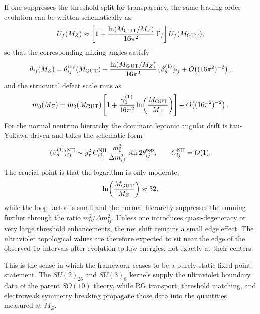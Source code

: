 \documentclass[11pt]{article}
\begin{document}
If one suppresses the threshold split for transparency, the same leading-order evolution can be written schematically as
\begin{equation}
 U_f(M_Z)
 \approx
 \left[\mathbf{1} + \frac{\ln(M_{\rm GUT}/M_Z)}{16\pi^2}\,\Gamma_f\right]U_f(M_{\rm GUT}),
\end{equation}
so that the corresponding mixing angles satisfy
\begin{equation}
 \theta_{ij}(M_Z)
 = \theta_{ij}^{\rm top}(M_{\rm GUT})
 + \frac{\ln(M_{\rm GUT}/M_Z)}{16\pi^2}\,(\beta_{\theta}^{(1)})_{ij}
 + O\!\left((16\pi^2)^{-2}\right),
\end{equation}
and the structural defect scale runs as
\begin{equation}
 m_0(M_Z)
 = m_0(M_{\rm GUT})
 \left[1 + \frac{\gamma_0^{(1)}}{16\pi^2}\ln\!\left(\frac{M_{\rm GUT}}{M_Z}\right)\right]
 + O\!\left((16\pi^2)^{-2}\right).
\end{equation}
For the normal neutrino hierarchy the dominant leptonic angular drift is tau-Yukawa driven and takes the schematic form
\begin{equation}
 (\beta_{\theta}^{(1)})_{ij}^{\rm NH}
 \sim
 y_{\tau}^2\,C_{ij}^{\rm NH}\,\frac{m_0^2}{\Delta m_{ij}^2}\,\sin2\theta_{ij}^{\rm top},
 \qquad
 C_{ij}^{\rm NH}=O(1).
\end{equation}
The crucial point is that the logarithm is only moderate,
\begin{equation}
 \ln\!\left(\frac{M_{\rm GUT}}{M_Z}\right)\approx 32,
\end{equation}
while the loop factor is small and the normal hierarchy suppresses the running further through the ratio $m_0^2/\Delta m_{ij}^2$. Unless one introduces quasi-degeneracy or very large threshold enhancements, the net shift remains a small edge effect. The ultraviolet topological values are therefore expected to sit near the edge of the observed $1\sigma$ intervals after evolution to low energies, not exactly at their centers.

This is the sense in which the framework ceases to be a purely static fixed-point statement. The $SU(2)_{26}$ and $SU(3)_8$ kernels supply the ultraviolet boundary data of the parent $SO(10)$ theory, while RG transport, threshold matching, and electroweak symmetry breaking propagate those data into the quantities measured at $M_Z$.
\end{document}
